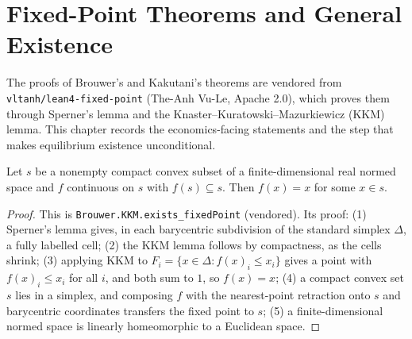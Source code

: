 \chapter{Fixed-Point Theorems and General Existence}
\label{chap:fixedpoint}

The proofs of Brouwer's and Kakutani's theorems are vendored from \texttt{vltanh/lean4-fixed-point} (The-Anh Vu-Le,
Apache 2.0), which proves them through Sperner's lemma and the Knaster--Kuratowski--Mazurkiewicz (KKM) lemma. This
chapter records the economics-facing statements and the step that makes equilibrium existence unconditional.

\begin{theorem}
\label{thm:brouwer}
\leanok
Let $s$ be a nonempty compact convex subset of a finite-dimensional real normed space and $f$ continuous on $s$ with
$f(s) \subseteq s$. Then $f(x) = x$ for some $x \in s$.
\end{theorem}
\begin{proof}
\leanok
This is \texttt{Brouwer.KKM.exists\_fixedPoint} (vendored). Its proof: (1) Sperner's lemma gives, in each barycentric
subdivision of the standard simplex $\Delta$, a fully labelled cell; (2) the KKM lemma follows by compactness, as the
cells shrink; (3) applying KKM to $F_i = \{x \in \Delta : f(x)_i \le x_i\}$ gives a point with $f(x)_i \le x_i$ for all
$i$, and both sum to $1$, so $f(x) = x$; (4) a compact convex set $s$ lies in a simplex, and composing $f$ with the
nearest-point retraction onto $s$ and barycentric coordinates transfers the fixed point to $s$; (5) a
finite-dimensional normed space is linearly homeomorphic to a Euclidean space.
\end{proof}

